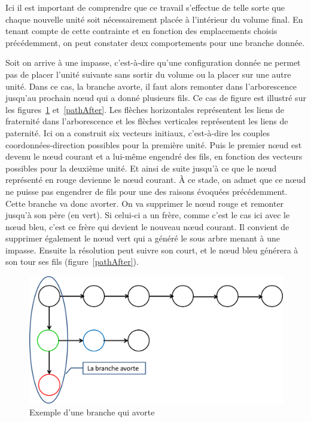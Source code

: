Ici il est important de comprendre que ce travail s’effectue de telle sorte que chaque nouvelle unité soit nécessairement placée à l’intérieur du volume final. En tenant compte de cette contrainte et en fonction des emplacements choisis précédemment, on peut constater deux comportements pour une branche donnée. 

Soit on arrive à une impasse, c’est-à-dire qu’une configuration donnée ne permet pas de placer l’unité suivante sans sortir du volume ou la placer sur une autre unité. Dans ce cas, la branche avorte, il faut alors remonter dans l’arborescence jusqu’au prochain nœud qui a donné plusieurs fils. Ce cas de figure est illustré sur les figures~\ref{pathAbort} et~\ref{pathAfter}. Les flèches horizontales représentent les liens de fraternité dans l’arborescence et les flèches verticales représentent les liens de paternité. Ici on a construit six vecteurs initiaux, c’est-à-dire les couples coordonnées-direction possibles pour la première unité. Puis le premier nœud est devenu le nœud courant et a lui-même engendré des fils, en fonction des vecteurs possibles pour la deuxième unité. Et ainsi de suite jusqu’à ce que le nœud représenté en rouge devienne le nœud courant. À ce stade, on admet que ce nœud ne puisse pas engendrer de fils pour une des raisons évoquées précédemment. Cette branche va donc avorter. On va supprimer le nœud rouge et remonter jusqu’à son père (en vert). Si celui-ci a un frère, comme c’est le cas ici avec le nœud bleu, c’est ce frère qui devient le nouveau nœud courant. Il convient de supprimer également le nœud vert qui a généré le sous arbre menant à une impasse.  Ensuite la résolution peut suivre son court, et le nœud bleu générera à son tour ses fils (figure~\ref{pathAfter}).

\begin{figure}[h]
 \centering
 \includegraphics[scale=0.3,keepaspectratio=true]{img/pathAbort.png}
 \caption{Exemple d'une branche qui avorte}
 \label{pathAbort}
\end{figure}

